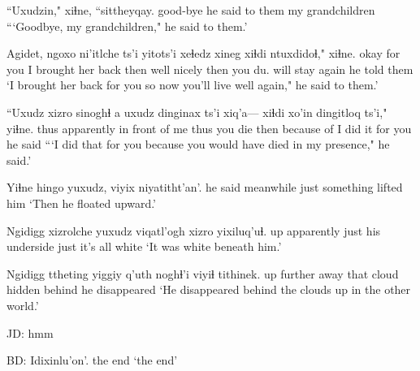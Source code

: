\documentclass[12pt]{article}
\begin{document}
\gll ``Uxudzin," xiɬne, ``sittheyqay.
good-bye {he said to them} {my grandchildren}
\glt ```Goodbye, my grandchildren," he said to them.' 
\glend

\gll Agidet, ngoxo ni'itlche ts'i yitots'i xeɬedz xineg xiɬdi ntuxdidoɬ," xiɬne.
okay {for you} {I brought her back} {} then well nicely then {you du. will stay again} {he told them}
\glt `I brought her back for you so now you'll live well again," he said to them.'
\glend

\gll ``Uxudz xizro sinoghɬ a uxudz dinginax ts'i xiq'a--- xiɬdi xo'in dingitloq ts'i," yiɬne.
thus apparently {in front of me} {} thus {you die} {} {} then {because of} {I did it for you} {} {he said}
\glt ```I did that for you because you would have died in my presence," he said.'
\glend

\gll Yiɬne hingo yuxudz, viyix niyatitht'an'.
{he said} meanwhile just  {something lifted him}
\glt `Then he floated upward.'
\glend

\gll Ngidigg xizrolche yuxudz viqatl'ogh xizro yixiluq'uɬ.
up apparently just {his underside} just {it's all white}
\glt `It was white beneath him.'
\glend

\gll Ngidigg ttheting yiggiy q'uth noghɬ'i {viyiɬ tithinek.}
up {further away} that cloud {hidden behind} {he disappeared}
\glt `He disappeared behind the clouds up in the other world.'
\glend

JD:  hmm

BD:
\gll Idixinlu'on'.
{{the end}}
\glt `the end'
\glend
\end{document}
